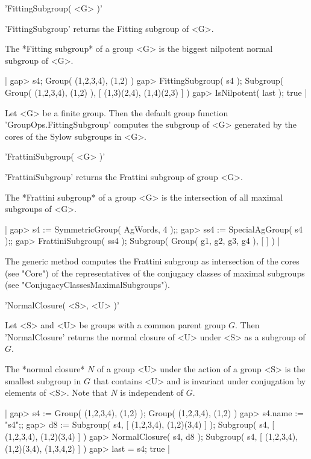 
'FittingSubgroup( <G> )'

'FittingSubgroup' returns the Fitting subgroup of <G>.

The *Fitting subgroup* of a  group  <G> is the  biggest  nilpotent normal
subgroup of <G>.

|    gap> s4;
    Group( (1,2,3,4), (1,2) )
    gap> FittingSubgroup( s4 );
    Subgroup( Group( (1,2,3,4), (1,2) ), [ (1,3)(2,4), (1,4)(2,3) ] )
    gap> IsNilpotent( last );
    true |

Let  <G>  be   a  finite  group.     Then  the  default  group   function
'GroupOps.FittingSubgroup' computes the subgroup of  <G> generated by the
cores of the Sylow subgroups in <G>.


'FrattiniSubgroup( <G> )' 

'FrattiniSubgroup' returns the Frattini subgroup of group <G>.

The *Frattini subgroup* of a group <G> is the intersection of all maximal
subgroups of <G>.

|    gap> s4 := SymmetricGroup( AgWords, 4 );;
    gap> ss4 := SpecialAgGroup( s4 );;
    gap> FrattiniSubgroup( ss4 );
    Subgroup( Group( g1, g2, g3, g4 ), [  ] ) |

The generic method computes the Frattini subgroup  as intersection of the
cores (see  "Core")  of the  representatives of  the conjugacy classes of
maximal subgroups (see "ConjugacyClassesMaximalSubgroups").


'NormalClosure( <S>, <U> )'

Let  <S>  and <U>  be  groups  with  a  common  parent group  $G$.   Then
'NormalClosure' returns the normal closure of <U> under <S> as a subgroup
of $G$.

The *normal  closure* $N$ of a group <U>  under the action of a group <S>
is the smallest subgroup in $G$ that contains <U>  and is invariant under
conjugation by elements of <S>.  Note that $N$ is independent of $G$.

|    gap> s4 := Group( (1,2,3,4), (1,2) );
    Group( (1,2,3,4), (1,2) )
    gap> s4.name := "s4";;
    gap> d8 := Subgroup( s4, [ (1,2,3,4), (1,2)(3,4) ] );
    Subgroup( s4, [ (1,2,3,4), (1,2)(3,4) ] )
    gap> NormalClosure( s4, d8 );
    Subgroup( s4, [ (1,2,3,4), (1,2)(3,4), (1,3,4,2) ] )
    gap> last = s4;
    true |

